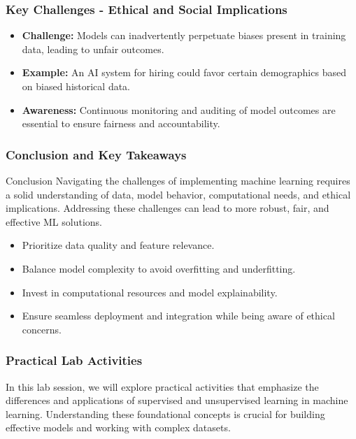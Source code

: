 \documentclass[aspectratio=169]{beamer}
\begin{document}
\begin{frame}[fragile]
    \frametitle{Key Challenges - Ethical and Social Implications}
    \begin{itemize}
        \item \textbf{Challenge:} Models can inadvertently perpetuate biases present in training data, leading to unfair outcomes.
        \item \textbf{Example:} An AI system for hiring could favor certain demographics based on biased historical data.
        \item \textbf{Awareness:} Continuous monitoring and auditing of model outcomes are essential to ensure fairness and accountability.
    \end{itemize}
\end{frame}

\begin{frame}[fragile]
    \frametitle{Conclusion and Key Takeaways}
    \begin{block}{Conclusion}
        Navigating the challenges of implementing machine learning requires a solid understanding of data, model behavior, computational needs, and ethical implications. Addressing these challenges can lead to more robust, fair, and effective ML solutions.
    \end{block}
    \begin{itemize}
        \item Prioritize data quality and feature relevance.
        \item Balance model complexity to avoid overfitting and underfitting.
        \item Invest in computational resources and model explainability.
        \item Ensure seamless deployment and integration while being aware of ethical concerns.
    \end{itemize}
\end{frame}

\begin{frame}
    \frametitle{Practical Lab Activities}
    In this lab session, we will explore practical activities that emphasize the differences and applications of supervised and unsupervised learning in machine learning. 
    Understanding these foundational concepts is crucial for building effective models and working with complex datasets.
\end{frame}
\end{document}
